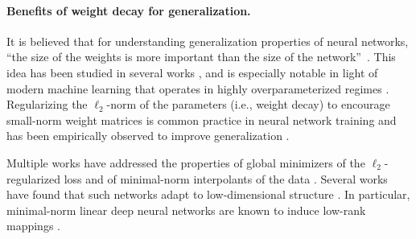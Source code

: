 \paragraph{Benefits of weight decay for generalization.}
It is believed that for understanding generalization properties of neural networks, “the size of the weights is more important than the size of the network”~\cite{bartlett1996valid}.
This idea has been studied in several works \cite{neyshabur2014search,neyshabur2015norm,wei2019regularization,daniely2019generalization,golowich2020size,parkinson2024depth},
and is especially notable in light of modern machine learning that operates in highly overparameterized regimes \cite{zhang2021understanding}.
Regularizing the $\ell_2$-norm of the parameters (i.e., weight decay) to encourage small-norm weight matrices is common practice in neural network training and has been empirically observed to improve generalization \cite{krogh1991simple,bos1996using,zhangthree,d2023we}.

Multiple works have addressed the properties of global minimizers of the $\ell_2$-regularized loss and of minimal-norm interpolants of the data \cite{savarese2019infinite,ongie2019function,ma2022barron,parhi2022near,boursier2023penalising}. Several works have found that such networks adapt to low-dimensional structure \cite{bach2017breaking,parkinson2023linear,Jacot23,kobayashi2024weight}.
In particular, minimal-norm linear deep neural networks are known to induce low-rank mappings \cite{shang2020unified,dai2021}.

\vspace*{-1em}
